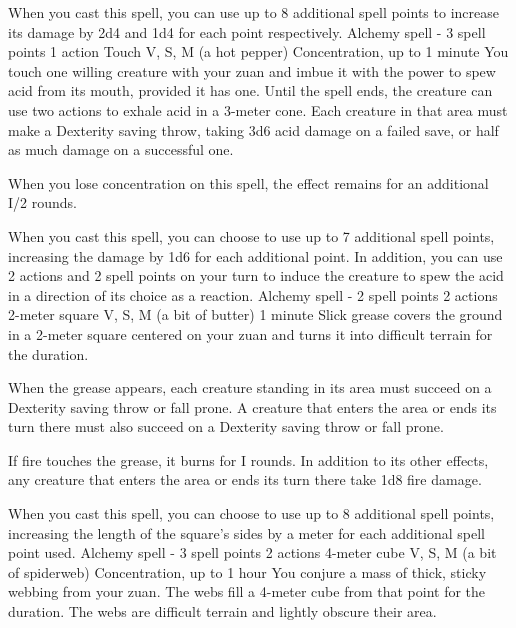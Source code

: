         When you cast this spell, you can use up to 8 additional spell points to increase its damage by 2d4 and 1d4 for each point respectively.
        {Alchemy spell - 3 spell points}
        {1 action}
        {Touch}
        {V, S, M (a hot pepper)}
        {Concentration, up to 1 minute}
        You touch one willing creature with your zuan and imbue it with the power to spew acid from its mouth, provided it has one.
        Until the spell ends, the creature can use two actions to exhale acid in a 3-meter cone.
        Each creature in that area must make a Dexterity saving throw, taking 3d6 acid damage on a failed save, or half as much damage on a successful one.

        When you lose concentration on this spell, the effect remains for an additional I/2 rounds.

        When you cast this spell, you can choose to use up to 7 additional spell points, increasing the damage by 1d6 for each additional point.
        In addition, you can use 2 actions and 2 spell points on your turn to induce the creature to spew the acid in a direction of its choice as a reaction.
        {Alchemy spell - 2 spell points}
        {2 actions}
        {2-meter square}
        {V, S, M (a bit of butter)}
        {1 minute}
        Slick grease covers the ground in a 2-meter square centered on your zuan and turns it into difficult terrain for the duration.

        When the grease appears, each creature standing in its area must succeed on a Dexterity saving throw or fall prone.
        A creature that enters the area or ends its turn there must also succeed on a Dexterity saving throw or fall prone.

        If fire touches the grease, it burns for I rounds.
        In addition to its other effects, any creature that enters the area or ends its turn there take 1d8 fire damage.

        When you cast this spell, you can choose to use up to 8 additional spell points, increasing the length of the square's sides by a meter for each additional spell point used.
        {Alchemy spell - 3 spell points}
        {2 actions}
        {4-meter cube}
        {V, S, M (a bit of spiderweb)}
        {Concentration, up to 1 hour}
        You conjure a mass of thick, sticky webbing from your zuan.
        The webs fill a 4-meter cube from that point for the duration.
        The webs are difficult terrain and lightly obscure their area.

